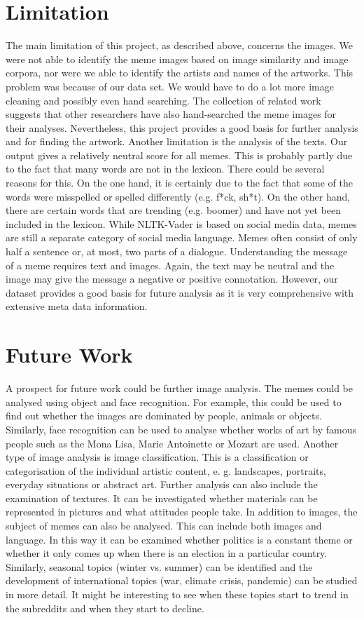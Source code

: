 \documentclass[11pt,a4paper]{article}
\begin{document}
 \section{Limitation}
 The main limitation of this project, as described above, concerns the images. We were not able to identify the meme images based on image similarity and image corpora, nor were we able to identify the artists and names of the artworks. This problem was because of our data set. We would have to do a lot more image cleaning and possibly even hand searching. The collection of related work suggests that other researchers have also hand-searched the meme images for their analyses. Nevertheless, this project provides a good basis for further analysis and for finding the artwork.
Another limitation is the analysis of the texts. Our output gives a relatively neutral score for all memes. This is probably partly due to the fact that many words are not in the lexicon. There could be several reasons for this. On the one hand, it is certainly due to the fact that some of the words were misspelled or spelled differently (e.g. f*ck, sh*t). On the other hand, there are certain words that are trending (e.g. boomer) and have not yet been included in the lexicon. While NLTK-Vader is based on social media data, memes are still a separate category of social media language. Memes often consist of only half a sentence or, at most, two parts of a dialogue. Understanding the message of a meme requires text and images. Again, the text may be neutral and the image may give the message a negative or positive connotation.
However, our dataset provides a good basis for future analysis as it is very comprehensive with extensive meta data information.

 \section{Future Work}
 A prospect for future work could be further image analysis. The memes could be analysed using object and face recognition. For example, this could be used to find out whether the images are dominated by people, animals or objects. Similarly, face recognition can be used to analyse whether works of art by famous people such as the Mona Lisa, Marie Antoinette or Mozart are used. Another type of image analysis is image classification. This is a classification or categorisation of the individual artistic content, e. g. landscapes, portraits, everyday situations or abstract art. Further analysis can also include the examination of textures. It can be investigated whether materials can be represented in pictures and what attitudes people take.
 In addition to images, the subject of memes can also be analysed. This can include both images and language. In this way it can be examined whether politics is a constant theme or whether it only comes up when there is an election in a particular country. Similarly, seasonal topics (winter vs. summer) can be identified and the development of international topics (war, climate crisis, pandemic) can be studied in more detail. It might be interesting to see when these topics start to trend in the subreddits and when they start to decline.

%
%


\end{document}
